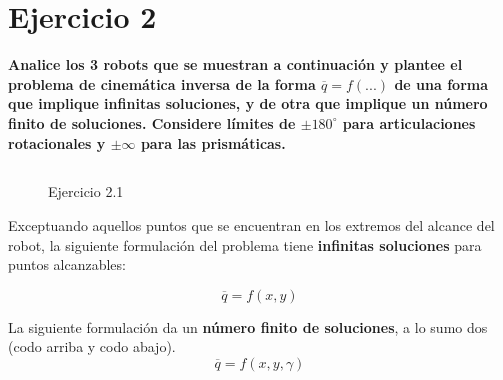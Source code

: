 \documentclass[a4paper,12pt]{article}
\begin{document}
\section{Ejercicio 2}
\textbf{Analice los 3 robots que se muestran a continuación y plantee el problema de
cinemática inversa de la forma $\overline{q} = f(...)$ de una forma que implique infinitas soluciones, y de
otra que implique un número finito de soluciones. Considere límites de $\pm 180^\circ$ para
articulaciones rotacionales y $\pm\infty$ para las prismáticas.}
\subsection{}
\begin{figure}[H]
    \centering
    \begin{adjustbox}{scale = 0.55, max width=\columnwidth}
    \end{adjustbox}
    \caption{Ejercicio 2.1}
\end{figure}

Exceptuando aquellos puntos que se encuentran en los extremos del alcance del robot, la siguiente formulación del problema
tiene \textbf{infinitas soluciones} para puntos alcanzables:

\begin{equation*}
    \overline{q} = f(x, y)
\end{equation*}

La siguiente formulación da un \textbf{número finito de soluciones}, a lo sumo dos (codo arriba y codo abajo).
\begin{equation*}
    \overline{q} = f(x, y, \gamma)
\end{equation*}
\end{document}
